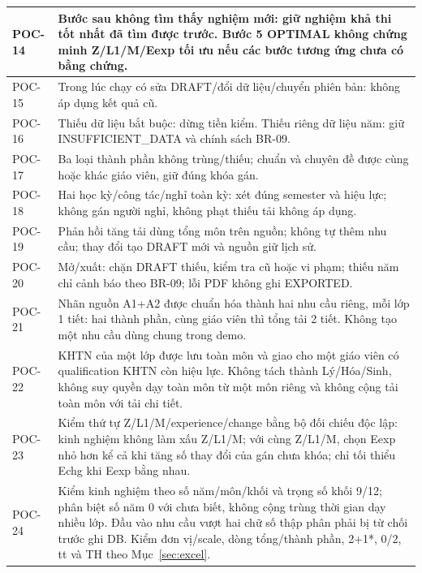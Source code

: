 \documentclass[12pt,a4paper]{report}
\begin{document}
\begin{longtable}{|p{1.6cm}|p{12.3cm}|}
POC-14 & Bước sau không tìm thấy nghiệm mới: giữ nghiệm khả thi tốt nhất đã tìm được trước. Bước 5 OPTIMAL không chứng minh Z/L1/M/Eexp tối ưu nếu các bước tương ứng chưa có bằng chứng. \\\hline
POC-15 & Trong lúc chạy có sửa DRAFT/đổi dữ liệu/chuyển phiên bản: không áp dụng kết quả cũ. \\\hline
POC-16 & Thiếu dữ liệu bắt buộc: dừng tiền kiểm. Thiếu riêng dữ liệu năm: giữ INSUFFICIENT\_DATA và chính sách BR-09. \\\hline
POC-17 & Ba loại thành phần không trùng/thiếu; chuẩn và chuyên đề được cùng hoặc khác giáo viên, giữ đúng khóa gán. \\\hline
POC-18 & Hai học kỳ/công tác/nghỉ toàn kỳ: xét đúng semester và hiệu lực; không gán người nghỉ, không phạt thiếu tải không áp dụng. \\\hline
POC-19 & Phản hồi tăng tải dùng tổng môn trên nguồn; không tự thêm nhu cầu; thay đổi tạo DRAFT mới và nguồn giữ lịch sử. \\\hline
POC-20 & Mở/xuất: chặn DRAFT thiếu, kiểm tra cũ hoặc vi phạm; thiếu năm chỉ cảnh báo theo BR-09; lỗi PDF không ghi EXPORTED. \\\hline
POC-21 & Nhãn nguồn A1+A2 được chuẩn hóa thành hai nhu cầu riêng, mỗi lớp 1 tiết: hai thành phần, cùng giáo viên thì tổng tải 2 tiết. Không tạo một nhu cầu dùng chung trong demo. \\\hline
POC-22 & KHTN của một lớp được lưu toàn môn và giao cho một giáo viên có qualification KHTN còn hiệu lực. Không tách thành Lý/Hóa/Sinh, không suy quyền dạy toàn môn từ một môn riêng và không cộng tải toàn môn với tải chi tiết. \\\hline
POC-23 & Kiểm thứ tự Z/L1/M/experience/change bằng bộ đối chiếu độc lập: kinh nghiệm không làm xấu Z/L1/M; với cùng Z/L1/M, chọn Eexp nhỏ hơn kể cả khi tăng số thay đổi của gán chưa khóa; chỉ tối thiểu Echg khi Eexp bằng nhau. \\\hline
POC-24 & Kiểm kinh nghiệm theo số năm/môn/khối và trọng số khối 9/12; phân biệt số năm 0 với chưa biết, không cộng trùng thời gian dạy nhiều lớp. Đầu vào nhu cầu vượt hai chữ số thập phân phải bị từ chối trước ghi DB. Kiểm đơn vị/scale, dòng tổng/thành phần, 2+1*, 0/2, tt và TH theo Mục~\ref{sec:excel}. \\\hline
\end{longtable}
\end{document}
